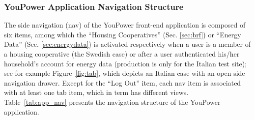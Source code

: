 %
%
%
%
%

\subsubsection{YouPower Application Navigation Structure}

The side navigation (nav) of the YouPower front-end application is composed of six items, among which the ``Housing Cooperatives'' (Sec. \ref{sec:brf}) or ``Energy Data'' (Sec. \ref{sec:energydata}) is activated respectively when a user is a member of a housing cooperative (the Swedish case) or after a user authenticated his/her household's account for energy data (production is only for the Italian test site); see for example Figure~\ref{fig:tab}, which depicts an Italian case with an open side navigation drawer. 
Except for the ``Log Out'' item, each nav item is associated with at least one tab item, which in term has different views. Table~\ref{tab:app_nav} presents the navigation structure of the YouPower application. 

